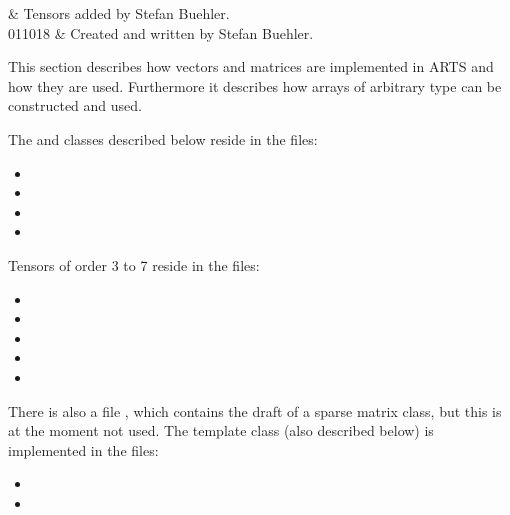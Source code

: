 %
%
\label{sec:matpack}


%
%
 & Tensors added by Stefan Buehler.\\
  011018 & Created and written by Stefan Buehler.\\
\stophistory




%
%

This section describes how vectors and matrices are implemented in
ARTS and how they are used. Furthermore it describes how arrays of
arbitrary type can be constructed and used.


\label{sec:matpack:files}

The  and  classes described below reside in the files:
\begin{itemize}
\item {}
\item {}
\item {}
\item {}
\end{itemize}

Tensors of order 3 to 7 reside in the files:
\begin{itemize}
\item {}
\item {}
\item {}
\item {}
\item {}
\end{itemize}

There is also a file , which contains the draft of a sparse
matrix class, but this is at the moment not used. The template class
 (also described below) is implemented in the files:
\begin{itemize}
\item {}
\item {}
\end{itemize}

